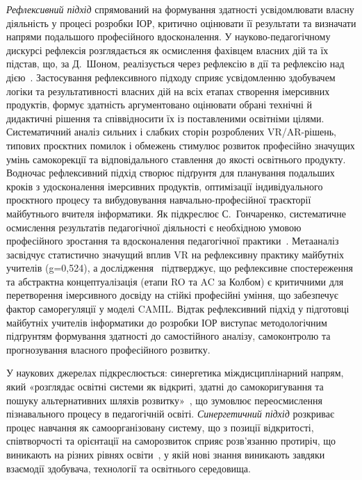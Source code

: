 \emph{Рефлексивний підхід} спрямований на формування здатності усвідомлювати власну діяльність у процесі розробки ІОР, критично оцінювати її результати та визначати напрями подальшого професійного вдосконалення. У науково-педагогічному дискурсі рефлексія розглядається як осмислення фахівцем власних дій та їх підстав, що, за Д.~Шоном, реалізується через рефлексію в дії та рефлексію над дією~\cite{ReflexiveApproach2018}. Застосування рефлексивного підходу сприяє усвідомленню здобувачем логіки та результативності власних дій на всіх етапах створення імерсивних продуктів, формує здатність аргументовано оцінювати обрані технічні й дидактичні рішення та співвідносити їх із поставленими освітніми цілями. Систематичний аналіз сильних і слабких сторін розроблених VR/AR-рішень, типових проєктних помилок і обмежень стимулює розвиток професійно значущих умінь самокорекції та відповідального ставлення до якості освітнього продукту. Водночас рефлексивний підхід створює підґрунтя для планування подальших кроків з удосконалення імерсивних продуктів, оптимізації індивідуального проєктного процесу та вибудовування навчально-професійної траєкторії майбутнього вчителя інформатики. Як підкреслює С.~Гончаренко, систематичне осмислення результатів педагогічної діяльності є необхідною умовою професійного зростання та вдосконалення педагогічної практики~\cite{Goncharenko2011Pedagogy}. Метааналіз~\cite{Han2025VRTeacherEd} засвідчує статистично значущий вплив VR на рефлексивну практику майбутніх учителів (g=0,524), а дослідження~\cite{Kee2023Experiential} підтверджує, що рефлексивне спостереження та абстрактна концептуалізація (етапи RO та AC за Колбом) є критичними для перетворення імерсивного досвіду на стійкі професійні уміння, що забезпечує фактор саморегуляції у моделі CAMIL. Відтак рефлексивний підхід у підготовці майбутніх учителів інформатики до розробки ІОР виступає методологічним підґрунтям формування здатності до самостійного аналізу, самоконтролю та прогнозування власного професійного розвитку.

У наукових джерелах підкреслюється: синергетика міждисциплінарний напрям, який «розглядає освітні системи як відкриті, здатні до самокоригування та пошуку альтернативних шляхів розвитку»~\cite[c.~49]{Kuzminskyi2012Pedagogy}, що зумовлює переосмислення пізнавального процесу в педагогічній освіті. \emph{Синергетичний підхід} розкриває процес навчання як самоорганізовану систему, що з позиції відкритості, співтворчості та орієнтації на саморозвиток сприяє розв'язанню протиріч, що виникають на різних рівнях освіти~\cite{Kuzminskyi2012Pedagogy}, у якій нові знання виникають завдяки взаємодії здобувача, технології та освітнього середовища.

